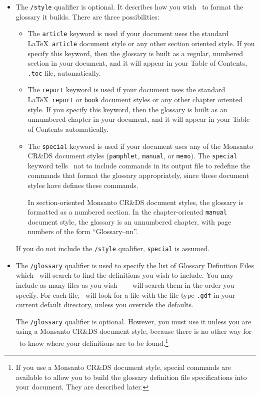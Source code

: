 \begin{itemize}
\item The {\tt /style} qualifier 
is optional.  It describes how you wish \GloTeX\ to
format the glossary it builds.  There are three possibilities: 

\begin{itemize}

\item The {\tt article} keyword is used if your document uses the 
standard \LaTeX\ {\tt article} document style or any other section oriented
style.  If you specify this keyword, then the glossary is built as a regular,
numbered section in your document, and it will appear in your Table of
Contents, {\tt .toc} file, automatically.

\item  The {\tt report} keyword is used if your document uses the 
standard \LaTeX\ {\tt report} or {\tt book} document styles or any other
chapter oriented style.  If you specify this keyword, then the glossary is built
as an unnumbered chapter in your document, and it will appear in your Table of
Contents automatically.

\item  The {\tt special} keyword is used if your document uses any of
the Monsanto CR\&DS document styles ({\tt pamphlet}, {\tt manual}, or 
{\tt memo}).   The {\tt special} keyword tells \GloTeX\ not to include
commands in its output file to redefine the commands that format the glossary
appropriately, since these document styles have defines these commands.

In section-oriented Monsanto CR\&DS document styles, the glossary is formatted
as a numbered section.  In the chapter-oriented {\tt manual} document style, the
glossary is an unnumbered chapter, with page numbers of the form 
``\mbox{Glossary--nn}''.

\end{itemize}
If you do not include the {\tt /style} qualifier, {\tt special} is assumed.


\item The {\tt /glossary} qualifier is used to specify the list of Glossary
Definition Files which \GloTeX\ will search to find the definitions you wish to
include. You may include as many files as you wish --- \GloTeX\ will search
them in the order you specify.  For each file, \GloTeX\ will look for a file
with the file type {\tt .gdf} in your current default directory, unless you
override the defaults. 

The {\tt /glossary} qualifier is optional.  However, you must use it unless
you are using a Monsanto CR\&DS document style, because there is no other way
for \GloTeX\ to know where your definitions are to be found.\footnote{If you use
a Monsanto CR\&DS document style, special commands are available to allow you to
build the glossary definition file specifications into your document. They are
described later.} 
\end{itemize}    

